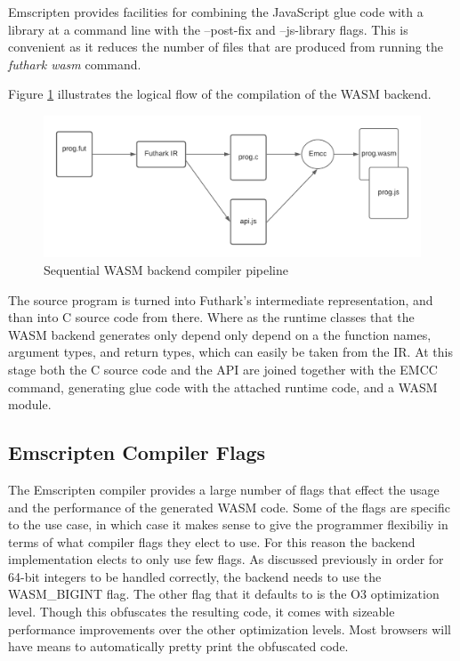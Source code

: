 \documentclass[11pt]{book}
\begin{document}

Emscripten provides facilities for combining the JavaScript glue code with a library at a command line with the --post-fix and --js-library flags. This is convenient as it reduces the number of files that are produced from running the \textit{futhark wasm} command.



Figure \ref{fig:wasm} illustrates the logical flow of the compilation of the WASM backend. 

\begin{figure}[htbp]
\centerline{\includegraphics[width=\textwidth]{figures/compiler_pipeline.png}}
\caption{Sequential WASM backend compiler pipeline}
\label{fig:wasm}
\end{figure}

The source program is turned into Futhark's intermediate representation, and than into C source code from there. Where as the runtime classes that the WASM backend generates only depend only depend on a the function names, argument types, and return types, which can easily be taken from the IR. At this stage both the C source code and the API are joined together with the EMCC command, generating glue code with the attached runtime code, and a WASM module. 

\subsection{Emscripten Compiler Flags}
The Emscripten compiler provides a large number of flags that effect the usage and the performance of the generated WASM code. Some of the flags are specific to the use case, in which case it makes sense to give the programmer flexibiliy in terms of what compiler flags they elect to use. For this reason the backend implementation elects to only use few flags. As discussed previously in order for 64-bit integers to be handled correctly, the backend needs to use the WASM\_BIGINT flag. The other flag that it defaults to is the O3 optimization level. Though this obfuscates the resulting code, it comes with sizeable performance improvements over the other optimization levels. Most browsers will have means to automatically pretty print the obfuscated code.
\end{document}

